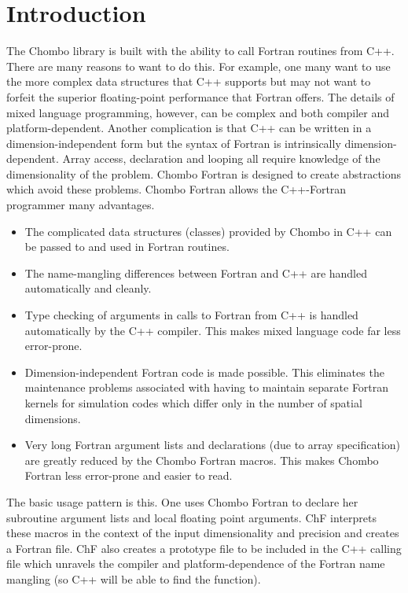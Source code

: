 \section{Introduction}

The Chombo library is built with the ability to call Fortran routines
from C++.  There are many reasons to want to do this.  For example,
one many want to use the more complex data structures that C++
supports but may not want to forfeit the superior floating-point
performance that Fortran offers.  The details of mixed language
programming, however, can be complex and both compiler and
platform-dependent.   Another complication is that C++ can be
written in a dimension-independent form but the syntax of 
Fortran is intrinsically dimension-dependent.  Array access,
declaration and looping all require knowledge of the dimensionality
of the problem.    Chombo Fortran is designed to create
abstractions which avoid these problems.
Chombo Fortran allows the C++-Fortran programmer many
advantages.
\begin{itemize}
\item The complicated data structures (classes) provided by Chombo in C++ can be 
        passed to and used in Fortran routines.
\item The name-mangling differences between Fortran and C++ are handled
        automatically and cleanly.
\item Type checking of arguments in calls to Fortran from C++ is
        handled automatically by the C++ compiler.  This makes 
       mixed language code far less error-prone.
\item Dimension-independent Fortran code is made possible.  This
       eliminates the maintenance problems associated with having
        to maintain separate Fortran kernels for simulation codes
        which differ only in the number of spatial dimensions.
\item Very long Fortran argument lists and declarations 
      (due to array specification) are greatly reduced by 
      the Chombo Fortran macros.  This makes Chombo Fortran less
      error-prone and easier to read.
\end{itemize}
The basic usage pattern is this.  One uses
Chombo Fortran to declare her subroutine argument lists and local floating
point arguments.  ChF  interprets these macros in the context of 
the input dimensionality and precision and creates a Fortran file. 
ChF also creates a prototype file to be included in the C++ calling file which 
unravels the compiler and platform-dependence of the Fortran name
mangling (so C++ will be able to find the function).  


